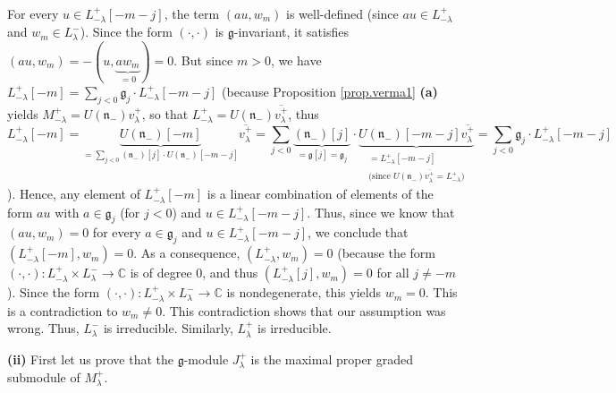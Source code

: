 \documentclass
[numbers=enddot,12pt,final,onecolumn,german,notitlepage]{scrartcl}%
\theoremstyle{definition}
\begin{document}
For every $u\in L_{-\lambda}^{+}\left[  -m-j\right]  $, the term $\left(
au,w_{m}\right)  $ is well-defined (since $au\in L_{-\lambda}^{+}$ and
$w_{m}\in L_{\lambda}^{-}$). Since the form $\left(  \cdot,\cdot\right)  $ is
$\mathfrak{g}$-invariant, it satisfies $\left(  au,w_{m}\right)  =-\left(
u,\underbrace{aw_{m}}_{=0}\right)  =0$. But since $m>0$, we have $L_{-\lambda
}^{+}\left[  -m\right]  =\sum\limits_{j<0}\mathfrak{g}_{j}\cdot L_{-\lambda
}^{+}\left[  -m-j\right]  $ (because Proposition \ref{prop.verma1}
\textbf{(a)} yields $M_{-\lambda}^{+}=U\left(  \mathfrak{n}_{-}\right)
v_{\lambda}^{+}$, so that $L_{-\lambda}^{+}=U\left(  \mathfrak{n}_{-}\right)
\overline{v_{\lambda}^{+}}$, thus%
\[
L_{-\lambda}^{+}\left[  -m\right]  =\underbrace{U\left(  \mathfrak{n}%
_{-}\right)  \left[  -m\right]  }_{=\sum\limits_{j<0}\left(  \mathfrak{n}%
_{-}\right)  \left[  j\right]  \cdot U\left(  \mathfrak{n}_{-}\right)  \left[
-m-j\right]  }\overline{v_{\lambda}^{+}}=\sum\limits_{j<0}\underbrace{\left(
\mathfrak{n}_{-}\right)  \left[  j\right]  }_{=\mathfrak{g}\left[  j\right]
=\mathfrak{g}_{j}}\cdot\underbrace{U\left(  \mathfrak{n}_{-}\right)  \left[
-m-j\right]  \overline{v_{\lambda}^{+}}}_{\substack{=L_{-\lambda}^{+}\left[
-m-j\right]  \\\text{(since }U\left(  \mathfrak{n}_{-}\right)  \overline
{v_{\lambda}^{+}}=L_{-\lambda}^{+}\text{)}}}=\sum\limits_{j<0}\mathfrak{g}%
_{j}\cdot L_{-\lambda}^{+}\left[  -m-j\right]
\]
). Hence, any element of $L_{-\lambda}^{+}\left[  -m\right]  $ is a linear
combination of elements of the form $au$ with $a\in\mathfrak{g}_{j}$ (for
$j<0$) and $u\in L_{-\lambda}^{+}\left[  -m-j\right]  $. Thus, since we know
that $\left(  au,w_{m}\right)  =0$ for every $a\in\mathfrak{g}_{j}$ and $u\in
L_{-\lambda}^{+}\left[  -m-j\right]  $, we conclude that $\left(  L_{-\lambda
}^{+}\left[  -m\right]  ,w_{m}\right)  =0$. As a consequence, $\left(
L_{-\lambda}^{+},w_{m}\right)  =0$ (because the form $\left(  \cdot
,\cdot\right)  :L_{-\lambda}^{+}\times L_{\lambda}^{-}\rightarrow\mathbb{C}$
is of degree $0$, and thus $\left(  L_{-\lambda}^{+}\left[  j\right]
,w_{m}\right)  =0$ for all $j\neq-m$). Since the form $\left(  \cdot
,\cdot\right)  :L_{-\lambda}^{+}\times L_{\lambda}^{-}\rightarrow\mathbb{C}$
is nondegenerate, this yields $w_{m}=0$. This is a contradiction to $w_{m}%
\neq0$. This contradiction shows that our assumption was wrong. Thus,
$L_{\lambda}^{-}$ is irreducible. Similarly, $L_{\lambda}^{+}$ is irreducible.

\textbf{(ii)} First let us prove that the $\mathfrak{g}$-module $J_{\lambda
}^{+}$ is the maximal proper graded submodule of $M_{\lambda}^{+}$.
\end{document}
